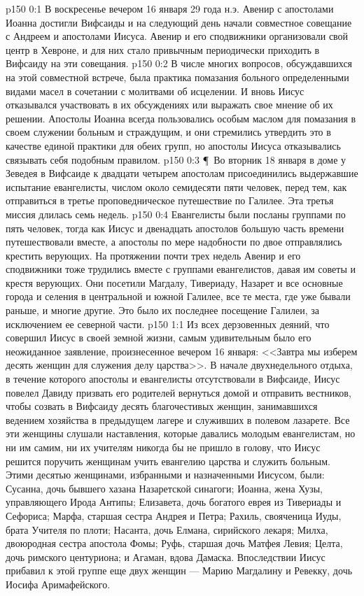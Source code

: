 \vs p150 0:1 В воскресенье вечером 16 января 29 года н.э. Авенир с апостолами Иоанна достигли Вифсаиды и на следующий день начали совместное совещание с Андреем и апостолами Иисуса. Авенир и его сподвижники организовали свой центр в Хевроне, и для них стало привычным периодически приходить в Вифсаиду на эти совещания.
\vs p150 0:2 В числе многих вопросов, обсуждавшихся на этой совместной встрече, была практика помазания больного определенными видами масел в сочетании с молитвами об исцелении. И вновь Иисус отказывался участвовать в их обсуждениях или выражать свое мнение об их решении. Апостолы Иоанна всегда пользовались особым маслом для помазания в своем служении больным и страждущим, и они стремились утвердить это в качестве единой практики для обеих групп, но апостолы Иисуса отказывались связывать себя подобным правилом.
\vs p150 0:3 \P\ Во вторник 18 января в доме у Зеведея в Вифсаиде к двадцати четырем апостолам присоединились выдержавшие испытание евангелисты, числом около семидесяти пяти человек, перед тем, как отправиться в третье проповедническое путешествие по Галилее. Эта третья миссия длилась семь недель.
\vs p150 0:4 Евангелисты были посланы группами по пять человек, тогда как Иисус и двенадцать апостолов большую часть времени путешествовали вместе, а апостолы по мере надобности по двое отправлялись крестить верующих. На протяжении почти трех недель Авенир и его сподвижники тоже трудились вместе с группами евангелистов, давая им советы и крестя верующих. Они посетили Магдалу, Тивериаду, Назарет и все основные города и селения в центральной и южной Галилее, все те места, где уже бывали раньше, и многие другие. Это было их последнее посещение Галилеи, за исключением ее северной части.
\vs p150 1:1 Из всех дерзовенных деяний, что совершил Иисус в своей земной жизни, самым удивительным было его неожиданное заявление, произнесенное вечером 16 января: <<Завтра мы изберем десять женщин для служения делу царства>>. В начале двухнедельного отдыха, в течение которого апостолы и евангелисты отсутствовали в Вифсаиде, Иисус повелел Давиду призвать его родителей вернуться домой и отправить вестников, чтобы созвать в Вифсаиду десять благочестивых женщин, занимавшихся ведением хозяйства в предыдущем лагере и служивших в полевом лазарете. Все эти женщины слушали наставления, которые давались молодым евангелистам, но ни им самим, ни их учителям никогда бы не пришло в голову, что Иисус решится поручить женщинам учить евангелию царства и служить больным. Этими десятью женщинами, избранными и назначенными Иисусом, были: Сусанна, дочь бывшего хазана Назаретской синагоги; Иоанна, жена Хузы, управляющего Ирода Антипы; Елизавета, дочь богатого еврея из Тивериады и Сефориса; Марфа, старшая сестра Андрея и Петра; Рахиль, свояченица Иуды, брата Учителя по плоти; Насанта, дочь Елмана, сирийского лекаря; Милха, двоюродная сестра апостола Фомы; Руфь, старшая дочь Матфея Левия; Целта, дочь римского центуриона; и Агаман, вдова Дамаска. Впоследствии Иисус прибавил к этой группе еще двух женщин --- Марию Магдалину и Ревекку, дочь Иосифа Аримафейского.
